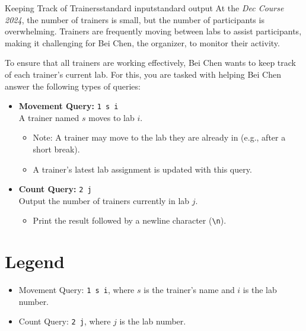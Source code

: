 \begin{problem}{Keeping Track of Trainers}{standard input}{standard output}
    At the \textit{Dec Course 2024}, the number of trainers is small, but the number of participants is overwhelming. Trainers are frequently moving between labs to assist participants, making it challenging for Bei Chen, the organizer, to monitor their activity.
    
    To ensure that all trainers are working effectively, Bei Chen wants to keep track of each trainer's current lab. For this, you are tasked with helping Bei Chen answer the following types of queries:
    
    \begin{itemize}
        \item \textbf{Movement Query:} \texttt{1 s i} \\
        A trainer named $s$ moves to lab $i$. 
        \begin{itemize}
            \item Note: A trainer may move to the lab they are already in (e.g., after a short break). 
            \item A trainer's latest lab assignment is updated with this query.
        \end{itemize}
    
        \item \textbf{Count Query:} \texttt{2 j} \\
        Output the number of trainers currently in lab $j$. 
        \begin{itemize}
            \item Print the result followed by a newline character (\texttt{\textbackslash n}).
        \end{itemize}
    \end{itemize}
    
    \section*{Legend}
    \begin{itemize}
        \item Movement Query: \texttt{1 s i}, where $s$ is the trainer's name and $i$ is the lab number.
        \item Count Query: \texttt{2 j}, where $j$ is the lab number.
    \end{itemize}
    

\end{problem}
